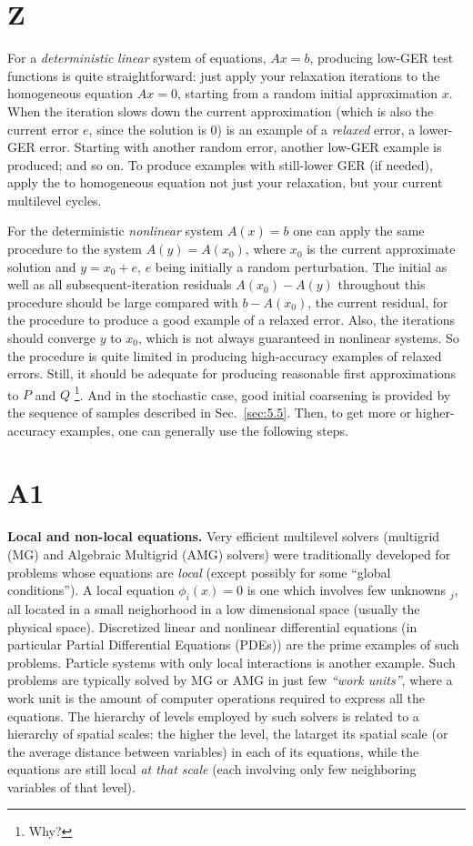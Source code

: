\documentclass{article} %
\begin{document}
\section{Z}
For a {\it deterministic} {\it linear} system of equations, $Ax = b$, producing low-GER test functions is quite straightforward: just apply your relaxation iterations to the homogeneous equation $Ax = 0$, starting from a random initial approximation $x$. When the iteration slows down the current approximation (which is also the current error $e$, since the solution is $0$) is an example of a {\it relaxed} error, a lower-GER error. Starting with another random error, another low-GER example is produced; and so on. To produce examples with still-lower GER (if needed), apply the to homogeneous equation not just your relaxation, but your current multilevel cycles.

For the deterministic {\it nonlinear} system $A(x) = b$ one can apply the same procedure to the system $A(y) = A(x_0)$, where $x_0$ is the current approximate solution and $y = x_0 + e$, $e$ being initially a random perturbation. The initial as well as all subsequent-iteration residuals $A(x_0) - A(y)$  throughout this procedure should be large compared with $b - A(x_0)$, the current residual, for the procedure to produce a good example of a relaxed error. Also, the iterations should converge $y$ to $x_0$, which is not always guaranteed in nonlinear systems. So the procedure is quite limited in producing high-accuracy examples of relaxed errors. Still, it should be adequate for producing reasonable first approximations to $P$ and $Q$ \footnote{Why?}. And in the stochastic case, good initial coarsening is provided by the sequence of samples described in Sec.~\ref{sec:5.5}. Then, to get more or higher-accuracy examples, one can generally use the following steps.

\section{A1}
{\bf Local and non-local equations.} Very efficient multilevel solvers (multigrid (MG) and Algebraic Multigrid (AMG) solvers) were traditionally developed for problems whose equations are {\it local} (except possibly for some ``global conditions''). A local equation $\phi_i(x)=0$ is one which involves few unknowns $_j$, all located in a small neighorhood in a low dimensional space (usually the physical space). Discretized linear and nonlinear differential equations (in particular Partial Differential Equations (PDEs)) are the prime examples of such problems. Particle systems with only local interactions is another example. Such problems are typically solved by MG or AMG in just few {\it ``work units''}, where a work unit is the amount of computer operations required to express all the equations. The hierarchy of levels employed by such solvers is related to a hierarchy of spatial scales: the higher the level, the latarget its spatial scale (or the average distance between variables) in each of its equations, while the equations are still local {\it at that scale} (each involving only few neighboring variables of that level).
\end{document}
